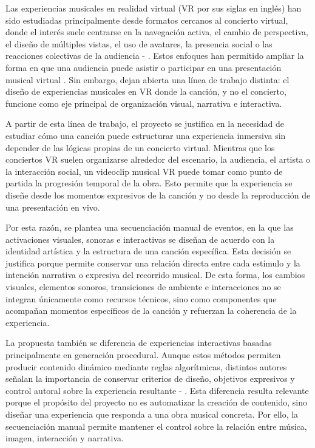 Las experiencias musicales en realidad virtual (VR por sus siglas en inglés) han sido estudiadas principalmente desde formatos cercanos al concierto virtual, donde el interés suele centrarse en la navegación activa, el cambio de perspectiva, el diseño de múltiples vistas, el uso de avatares, la presencia social o las reacciones colectivas de la audiencia \cite{lo2023immersive} - \cite{lee2023viewing}. Estos enfoques han permitido ampliar la forma en que una audiencia puede asistir o participar en una presentación musical virtual \cite{onderdijk2023concert}. Sin embargo, dejan abierta una línea de trabajo distinta: el diseño de experiencias musicales en VR donde la canción, y no el concierto, funcione como eje principal de organización visual, narrativa e interactiva.

A partir de esta línea de trabajo, el proyecto se justifica en la necesidad de estudiar cómo una canción puede estructurar una experiencia inmersiva sin depender de las lógicas propias de un concierto virtual. Mientras que los conciertos VR suelen organizarse alrededor del escenario, la audiencia, el artista o la interacción social, un videoclip musical VR puede tomar como punto de partida la progresión temporal de la obra. Esto permite que la experiencia se diseñe desde los momentos expresivos de la canción y no desde la reproducción de una presentación en vivo.

Por esta razón, se plantea una secuenciación manual de eventos, en la que las activaciones visuales, sonoras e interactivas se diseñan de acuerdo con la identidad artística y la estructura de una canción específica. Esta decisión se justifica porque permite conservar una relación directa entre cada estímulo y la intención narrativa o expresiva del recorrido musical. De esta forma, los cambios visuales, elementos sonoros, transiciones de ambiente e interacciones no se integran únicamente como recursos técnicos, sino como componentes que acompañan momentos específicos de la canción y refuerzan la coherencia de la experiencia.

La propuesta también se diferencia de experiencias interactivas basadas principalmente en generación procedural. Aunque estos métodos permiten producir contenido dinámico mediante reglas algorítmicas, distintos autores señalan la importancia de conservar criterios de diseño, objetivos expresivos y control autoral sobre la experiencia resultante \cite{yannakakis2011experience} - \cite{craveirinha2015designing}. Esta diferencia resulta relevante porque el propósito del proyecto no es automatizar la creación de contenido, sino diseñar una experiencia que responda a una obra musical concreta. Por ello, la secuenciación manual permite mantener el control sobre la relación entre música, imagen, interacción y narrativa.

